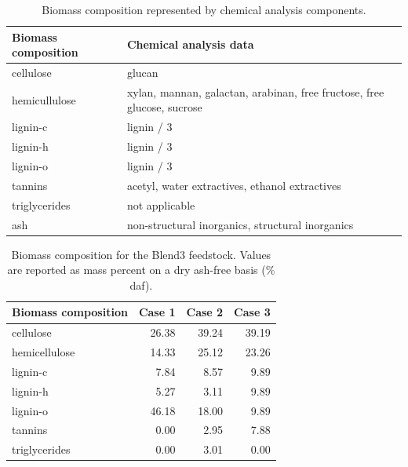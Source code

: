 \begin{table}[H]
    \centering
    \caption{Biomass composition represented by chemical analysis components.}
    \label{tab:biocomp-chem}
    \begin{tabular}{lp{3in}}
        \toprule
        Biomass composition & Chemical analysis data \\
        \midrule
        cellulose     & glucan \\
        \addlinespace[0.1in]
        hemicullulose & xylan, mannan, galactan, arabinan, free fructose, free glucose, sucrose \\
        \addlinespace[0.1in]
        lignin-c      & lignin / 3 \\
        \addlinespace[0.1in]
        lignin-h      & lignin / 3 \\
        \addlinespace[0.1in]
        lignin-o      & lignin / 3 \\
        \addlinespace[0.1in]
        tannins       & acetyl, water extractives, ethanol extractives \\
        \addlinespace[0.1in]
        triglycerides & not applicable \\
        \addlinespace[0.1in]
        ash           & non-structural inorganics, structural inorganics \\
        \bottomrule
    \end{tabular}
\end{table}

\begin{table}[H]
    \centering
    \caption{Biomass composition for the Blend3 feedstock. Values are reported as mass percent on a dry ash-free basis (\% daf).}
    \label{tab:blend3-biocomp}
    \begin{tabular}{lrrr}
        \toprule
        Biomass composition & Case 1 & Case 2 & Case 3 \\
        \midrule
        cellulose     & 26.38 & 39.24 & 39.19 \\
        hemicellulose & 14.33 & 25.12 & 23.26 \\
        lignin-c      & 7.84  & 8.57  & 9.89  \\
        lignin-h      & 5.27  & 3.11  & 9.89  \\
        lignin-o      & 46.18 & 18.00 & 9.89  \\
        tannins       & 0.00  & 2.95  & 7.88  \\
        triglycerides & 0.00  & 3.01  & 0.00  \\
        \bottomrule
    \end{tabular}
\end{table}

